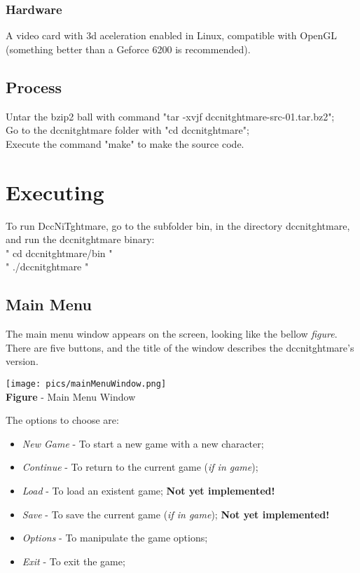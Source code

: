 \documentclass[ letterpaper,12pt]{article}
\begin{document}
\subsubsection{Hardware}
A video card with 3d aceleration enabled in Linux, compatible with OpenGL (something better than a Geforce 6200 is recommended).

\subsection{Process}

Untar the bzip2 ball with command "tar -xvjf dccnitghtmare-src-01.tar.bz2";\\
Go to the dccnitghtmare folder with "cd dccnitghtmare";\\
Execute the command "make" to make the source code.

\section{Executing}

To run DccNiTghtmare, go to the subfolder bin, in the directory dccnitghtmare, and run the dccnitghtmare binary:\\
" cd dccnitghtmare/bin "\\
" ./dccnitghtmare "

\subsection{Main Menu}

The main menu window appears on the screen, looking like the bellow {\it figure}. There are five buttons, and the title of the window describes the dccnitghtmare's version.

\begin{center}
  \texttt{[image: pics/mainMenuWindow.png]}
\\{\bf Figure} - Main Menu Window
\end{center}

The options to choose are:

\begin{itemize}
\item{{\it New Game} - To start a new game with a new character;}
\item{{\it Continue} - To return to the current game ({\it if in game});}
\item{{\it Load} - To load an existent game; {\bf Not yet implemented!}}
\item{{\it Save} - To save the current game ({\it if in game}); {\bf Not yet implemented!}}
\item{{\it Options} - To manipulate the game options;}
\item{{\it Exit} - To exit the game;}
\end{itemize}
\end{document}
